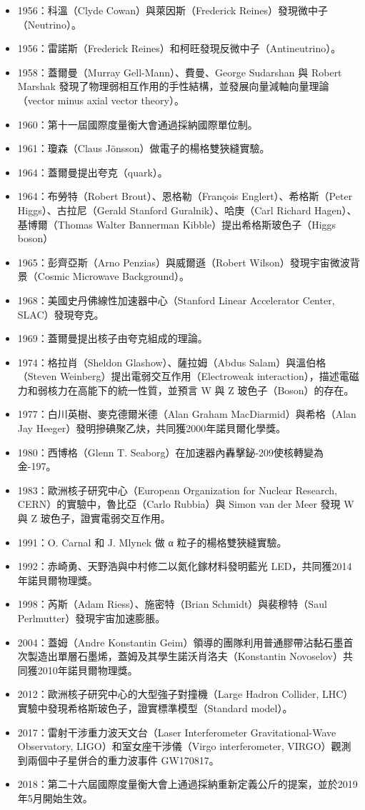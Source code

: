 \documentclass[a4paper,12pt]{article}
\begin{document}
\begin{itemize}
\item 1956：科溫（Clyde Cowan）與萊因斯（Frederick Reines）發現微中子（Neutrino）。
\item 1956：雷諾斯（Frederick Reines）和柯旺發現反微中子（Antineutrino）。
\item 1958：蓋爾曼（Murray Gell-Mann）、費曼、George Sudarshan 與 Robert Marshak 發現了物理弱相互作用的手性結構，並發展向量減軸向量理論（vector minus axial vector theory）。
\item 1960：第十一屆國際度量衡大會通過採納國際單位制。
\item 1961：瓊森（Claus Jönsson）做電子的楊格雙狹縫實驗。
\item 1964：蓋爾曼提出夸克（quark）。
\item 1964：布勞特（Robert Brout）、恩格勒（François Englert）、希格斯（Peter Higgs）、古拉尼（Gerald Stanford Guralnik）、哈庚（Carl Richard Hagen）、基博爾（Thomas Walter Bannerman Kibble）提出希格斯玻色子（Higgs boson）
\item 1965：彭齊亞斯（Arno Penzias）與威爾遜（Robert Wilson）發現宇宙微波背景（Cosmic Microwave Background）。
\item 1968：美國史丹佛線性加速器中心（Stanford Linear Accelerator Center, SLAC）發現夸克。
\item 1969：蓋爾曼提出核子由夸克組成的理論。
\item 1974：格拉肖（Sheldon Glashow）、薩拉姆（Abdus Salam）與溫伯格（Steven Weinberg）提出電弱交互作用（Electroweak interaction），描述電磁力和弱核力在高能下的統一性質，並預言 W 與 Z 玻色子（Boson）的存在。
\item 1977：白川英樹、麥克德爾米德（Alan Graham MacDiarmid）與希格（Alan Jay Heeger）發明摻碘聚乙炔，共同獲2000年諾貝爾化學獎。
\item 1980：西博格（Glenn T. Seaborg）在加速器內轟擊鉍-209使核轉變為金-197。
\item 1983：歐洲核子研究中心（European Organization for Nuclear Research, CERN）的實驗中，魯比亞（Carlo Rubbia）與 Simon van der Meer 發現 W 與 Z 玻色子，證實電弱交互作用。
\item 1991：O. Carnal 和 J. Mlynek 做 α 粒子的楊格雙狹縫實驗。
\item 1992：赤崎勇、天野浩與中村修二以氮化鎵材料發明藍光 LED，共同獲2014年諾貝爾物理獎。
\item 1998：芮斯（Adam Riess）、施密特（Brian Schmidt）與裴穆特（Saul Perlmutter）發現宇宙加速膨脹。
\item 2004：蓋姆（Andre Konstantin Geim）領導的團隊利用普通膠帶沾黏石墨首次製造出單層石墨烯，蓋姆及其學生諾沃肖洛夫（Konstantin Novoselov）共同獲2010年諾貝爾物理獎。
\item 2012：歐洲核子研究中心的大型強子對撞機（Large Hadron Collider, LHC）實驗中發現希格斯玻色子，證實標準模型（Standard model）。
\item 2017：雷射干涉重力波天文台（Laser Interferometer Gravitational-Wave Observatory, LIGO）和室女座干涉儀（Virgo interferometer, VIRGO）觀測到兩個中子星併合的重力波事件 GW170817。
\item 2018：第二十六屆國際度量衡大會上通過採納重新定義公斤的提案，並於2019年5月開始生效。
\end{itemize}
\end{document}
